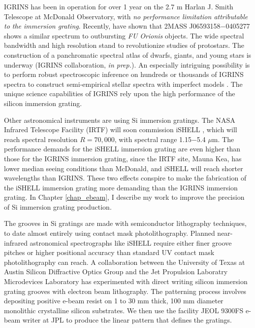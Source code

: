 IGRINS has been in operation for over 1 year on the 2.7 m Harlan J. Smith Telescope at McDonald Observatory, with \emph{no performance limitation attributable to the immersion grating}.  Recently, \citet{2015ATel.6901....1P} have shown that 2MASS J06593158$-$0405277 shows a similar spectrum to outbursting \emph{FU Orionis} objects.  The wide spectral bandwidth and high resolution stand to revolutionize studies of protostars.  The construction of a panchromatic spectral atlas of dwarfs, giants, and young stars is underway (IGRINS collaboration, \emph{in prep.}).  An especially intriguing possibility is to perform robust spectroscopic inference on hundreds or thousands of IGRINS spectra to construct semi-empirical stellar spectra with imperfect models \citep{2014arXiv1412.5177C}.  The unique science capabilities of IGRINS rely upon the high performance of the silicon immersion grating.

Other astronomical instruments are using Si immersion gratings.  The NASA Infrared Telescope Facility (IRTF) will soon commission iSHELL \citep{2012SPIE.8446E..2CR}, which will reach spectral resolution $R=70,000$, with spectral range 1.15$-$5.4 $\mu$m.  The performance demands for the iSHELL immersion grating are even higher than those for the IGRINS immersion grating, since the IRTF site, Mauna Kea, has lower median seeing conditions than McDonald, and iSHELL will reach shorter wavelengths than IGRINS.  These two effects conspire to make the fabrication of the iSHELL immersion grating more demanding than the IGRINS immersion grating.  In Chapter \ref{chap_ebeam}, I describe my work to improve the precision of Si immersion grating production.

The grooves in Si gratings are made with semiconductor lithography techniques, to date almost entirely using contact mask photolithography.  Planned near-infrared astronomical spectrographs like iSHELL require either finer groove pitches or higher positional accuracy than standard UV contact mask photolithography can reach.  A collaboration between the University of Texas at Austin Silicon Diffractive Optics Group and the Jet Propulsion Laboratry Microdevices Laboratory has experimented with direct writing silicon immersion grating grooves with electron beam lithography.  The patterning process involves depositing positive e-beam resist on 1 to 30 mm thick, 100 mm diameter monolithic crystalline silicon substrates.  We then use the facility JEOL 9300FS e-beam writer at JPL to produce the linear pattern that defines the gratings.

